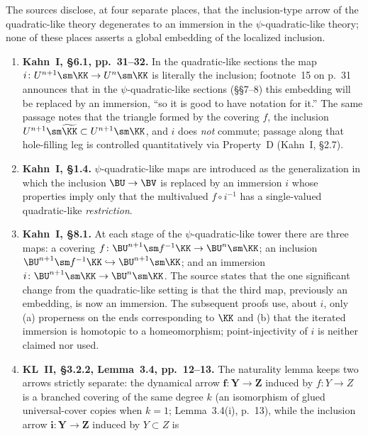 \begin{remark}\label{rem:kahn-immersion-disclosures}
The sources disclose, at four separate places, that the
inclusion-type arrow of the quadratic-like theory degenerates to an
immersion in the \(\psi\)-quadratic-like theory; none of these places
asserts a global embedding of the localized inclusion.
\begin{enumerate}
\item \textbf{Kahn~I, \S6.1, pp.~31--32.}  In the
quadratic-like sections the map
\(i\colon U^{n+1}\sm\KK\to U^n\sm\KK\) is literally the inclusion;
footnote~15 on p.~31 announces that in the \(\psi\)-quadratic-like
sections (\S\S7--8) this embedding will be
replaced by an immersion, ``so it is good to have notation for it.''
The same passage notes that the triangle
formed by the covering \(f\), the inclusion
\(U^{n+1}\sm\widetilde\KK\subset U^{n+1}\sm\KK\), and \(i\) does
\emph{not} commute; passage along that hole-filling leg is controlled
quantitatively via Property~D (Kahn~I, \S2.7).
\item \textbf{Kahn~I, \S1.4.}
\(\psi\)-quadratic-like maps are introduced as the generalization in
which the inclusion \(\BU\to\BV\) is replaced by an immersion \(i\)
whose properties imply only that the multivalued \(f\circ i^{-1}\) has
a single-valued quadratic-like \emph{restriction}.
\item \textbf{Kahn~I, \S8.1.}  At each stage of
the \(\psi\)-quadratic-like tower there are three maps: a covering
\(f\colon\BU^{n+1}\sm f^{-1}\KK\to\BU^n\sm\KK\); an inclusion
\(\BU^{n+1}\sm f^{-1}\KK\hookrightarrow\BU^{n+1}\sm\KK\); and an
immersion \(i\colon\BU^{n+1}\sm\KK\to\BU^n\sm\KK\).  The source
states that the one significant change from the quadratic-like setting
is that the third map, previously an embedding, is now an immersion.
The subsequent proofs use, about \(i\), only (a)
properness on the ends corresponding to \(\KK\) and (b)
that the iterated immersion is homotopic to a homeomorphism;
point-injectivity of \(i\) is neither claimed nor used.
\item \textbf{KL~II, \S3.2.2, Lemma~3.4, pp.~12--13.}  The naturality lemma
keeps two arrows strictly separate: the dynamical arrow
\(\mathbf f\colon\mathbf Y\to\mathbf Z\) induced by
\(f\colon Y\to Z\) is a branched covering of the same degree \(k\) (an
isomorphism of glued universal-cover copies when \(k=1\);
Lemma~3.4(i), p.~13), while the inclusion arrow
\(\mathbf i\colon\mathbf Y\to\mathbf Z\) induced by \(Y\subset Z\) is

\end{enumerate}
\end{remark}
